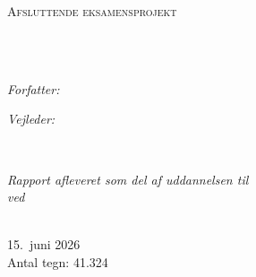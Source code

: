 \documentclass[
12pt, %
oneside, %
danish, %
singlespacing, %
parskip, %
headsepline, %
]{MastersDoctoralThesis} %
\author{Alexander Christensen} %
\begin{document}
\frontmatter %

\pagestyle{plain} %


\begin{titlepage}
\begin{center}

\vspace*{.06\textheight}
{\Large \deptname\par}\vspace{1.5cm}
\textsc{\Large Afsluttende eksamensprojekt}\\[0.5cm]

\HRule \\[0.4cm]
{\huge \bfseries \ttitle\par}\vspace{0.4cm}
\HRule \\[1.5cm]

\begin{minipage}[t]{0.4\textwidth}
\begin{flushleft} \large
\emph{Forfatter:}\\
\authorname
\end{flushleft}
\end{minipage}
\begin{minipage}[t]{0.4\textwidth}
\begin{flushright} \large
\emph{Vejleder:} \\
\supname
\end{flushright}
\end{minipage}\\[3cm]

\vfill

\large \textit{Rapport afleveret som del af uddannelsen til \degreename}\\[0.3cm]
\textit{ved}\\[0.4cm]
{\scshape\LARGE \univname}\\[2cm]

\vfill

{\large 15.\ juni 2026}\\[0.5cm]
{\normalsize Antal tegn: 41.324}\\[4cm]

\vfill
\end{center}
\end{titlepage}
\end{document}
